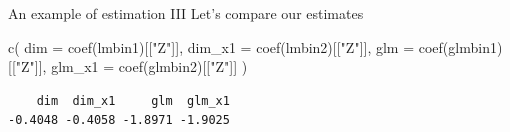 \documentclass[
  ignorenonframetext,
]{beamer}
\newenvironment{Shaded}{\begin{snugshade}}{\end{snugshade}}
\newcommand{\AttributeTok}[1]{\textcolor[rgb]{0.77,0.63,0.00}{#1}}
\newcommand{\FunctionTok}[1]{\textcolor[rgb]{0.00,0.00,0.00}{#1}}
\newcommand{\NormalTok}[1]{#1}
\newcommand{\StringTok}[1]{\textcolor[rgb]{0.31,0.60,0.02}{#1}}
\begin{document}
\begin{frame}[fragile]{An example of estimation III}
\protect\hypertarget{an-example-of-estimation-iii}{}
Let's compare our estimates

\scriptsize

\begin{Shaded}
\begin{Highlighting}[]
\FunctionTok{c}\NormalTok{(}
  \AttributeTok{dim =} \FunctionTok{coef}\NormalTok{(lmbin1)[[}\StringTok{"Z"}\NormalTok{]],}
  \AttributeTok{dim\_x1 =} \FunctionTok{coef}\NormalTok{(lmbin2)[[}\StringTok{"Z"}\NormalTok{]],}
  \AttributeTok{glm =} \FunctionTok{coef}\NormalTok{(glmbin1)[[}\StringTok{"Z"}\NormalTok{]],}
  \AttributeTok{glm\_x1 =} \FunctionTok{coef}\NormalTok{(glmbin2)[[}\StringTok{"Z"}\NormalTok{]]}
\NormalTok{)}
\end{Highlighting}
\end{Shaded}

\begin{verbatim}
    dim  dim_x1     glm  glm_x1 
-0.4048 -0.4058 -1.8971 -1.9025 
\end{verbatim}

\normalsize
\end{frame}
\end{document}
